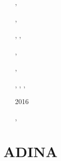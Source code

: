 \begin{small}
\begin{itemize}
\item[\nineteeneightyeight]  \textcite{reyu98}
\item[\twothousand]          \textcite{reyu00}
\item[\twothousandone]       \textcite{brry01}
\item[\twothousandtwo]       \textcite{gedh02}
\item[\twothousandthree]     \textcite{fumr03}
\item[\twothousandfour]      \textcite{wu04}
\item[\twothousandfive]      \textcite{heha05}
\item[\twothousandsix]       \textcite{hapf06}
\item[\twothousandseven]     \textcite{camg07}
\item[\twothousandeight]     \textcite{caon08},  \textcite{maha08}
\item[\twothousandnine]      \textcite{kuhe09},  \textcite{makh09}
\item[\twothousandten]       \textcite{camg10}
\item[\twothousandtwelve]    \textcite{nalr12},  \textcite{liha12}, \textcite{soyr12}
\item[\twothousandthirteen]  \textcite{soyl13},  \textcite{soyu13}
\item[\twothousandfourteen]  \textcite{fogm14},  \textcite{soyu14}
\item[\twothousandfifteen]   \textcite{pevp15}, \textcite{hahe15},  
                             \textcite{zeha15}, \textcite{soyu15}
\item[2016]                    \textcite{soca16}
\item[\twothousandseventeen]   \textcite{naam17}
\item[\twothousandeighteen]    \textcite{naam18}
\item[\twothousandnineteen]    \textcite{halk19}, \textcite{wowu19}
\item[\twothousandtwenty]      \textcite{soca20}
\item[\twothousandtwentyone]   \textcite{diha21}
\item[\twothousandtwentythree] \textcite{chho23}
\end{itemize}
\end{small}

\section{ADINA} 

